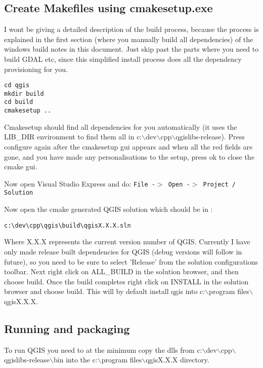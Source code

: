 \subsection{Create Makefiles using cmakesetup.exe}
I wont be giving a detailed description of the build process, because 
the process is explained in the first section (where you manually build 
all dependencies) of the windows build notes in this document. Just skip 
past the parts where you need to build GDAL etc, since this simplified 
install process does all the dependency provisioning for you.

\begin{verbatim}
cd qgis
mkdir build
cd build
cmakesetup ..
\end{verbatim}

Cmakesetup should find all dependencies for you automatically (it uses the 
LIB\_DIR environment to find them all in c:$\backslash$dev$\backslash$cpp$\backslash$qgislibs-release). 
Press configure again after the cmakesetup gui appears and when all the red 
fields are gone, and you have made any personalisations to the setup, press 
ok to close the cmake gui.

Now open Visual Studio Express and do: \texttt{File -$>$ Open -$>$ Project / Solution}

Now open the cmake generated QGIS solution which should be in :

\begin{verbatim}
c:\dev\cpp\qgis\build\qgisX.X.X.sln
\end{verbatim}

Where X.X.X represents the current version number of QGIS. Currently I 
have only made release built dependencies for QGIS (debug versions will follow 
in future), so you need to be sure to select 'Release' from the solution 
configurations toolbar. Next right click on ALL\_BUILD in the solution browser, and then choose build. Once the build completes right click on INSTALL in the solution browser and 
choose build. This will by default install qgis into c:$\backslash$program files$\backslash$qgisX.X.X.

\subsection{Running and packaging}
To run QGIS you need to at the minimum copy the dlls from c:$\backslash$dev$\backslash$cpp$\backslash$qgislibs-release$\backslash$bin 
into the c:$\backslash$program files$\backslash$qgisX.X.X directory.



